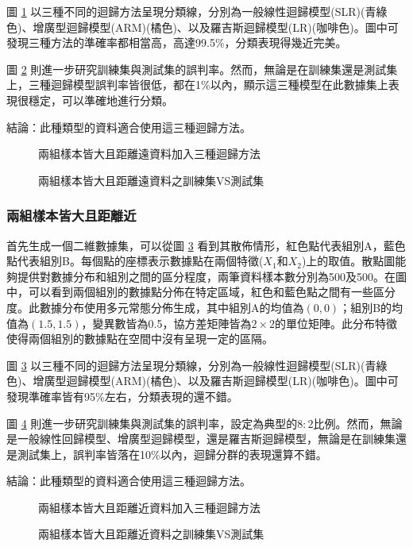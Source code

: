 圖 \ref{fig:rdn11-LARline} 以三種不同的迴歸方法呈現分類線，分別為一般線性迴歸模型(SLR)(青綠色)、增廣型迴歸模型(ARM)(橘色)、以及羅吉斯迴歸模型(LR)(咖啡色)。圖中可發現三種方法的準確率都相當高，高達99.5\%，分類表現得幾近完美。

圖 \ref{fig:rdn11-LARline2} 則進一步研究訓練集與測試集的誤判率。然而，無論是在訓練集還是測試集上，三種迴歸模型誤判率皆很低，都在1\%以內，顯示這三種模型在此數據集上表現很穩定，可以準確地進行分類。

結論：此種類型的資料適合使用這三種迴歸方法。
\begin{figure}[H]
    \caption{兩組樣本皆大且距離遠資料加入三種迴歸方法}
    \label{fig:rdn11-LARline}
\end{figure}
\begin{figure}[H]
    \caption{兩組樣本皆大且距離遠資料之訓練集VS測試集}
    \label{fig:rdn11-LARline2}
\end{figure}


\subsubsection{兩組樣本皆大且距離近}

首先生成一個二維數據集，可以從圖 \ref{fig:rdn12-LARline} 看到其散佈情形，紅色點代表組別A，藍色點代表組別B。每個點的座標表示數據點在兩個特徵($X_1$和$X_2$)上的取值。散點圖能夠提供對數據分布和組別之間的區分程度，兩筆資料樣本數分別為500及500。在圖中，可以看到兩個組別的數據點分佈在特定區域，紅色和藍色點之間有一些區分度。此數據分布使用多元常態分佈生成，其中組別A的均值為$(0, 0)$；組別B的均值為$(1.5, 1.5)$，變異數皆為0.5，協方差矩陣皆為$2 \times 2$的單位矩陣。此分布特徵使得兩個組別的數據點在空間中沒有呈現一定的區隔。

圖 \ref{fig:rdn12-LARline} 以三種不同的迴歸方法呈現分類線，分別為一般線性迴歸模型(SLR)(青綠色)、增廣型迴歸模型(ARM)(橘色)、以及羅吉斯迴歸模型(LR)(咖啡色)。圖中可發現準確率皆有95\%左右，分類表現的還不錯。

圖 \ref{fig:rdn12-LARline2} 則進一步研究訓練集與測試集的誤判率，設定為典型的$8:2$比例。然而，無論是一般線性回歸模型、增廣型迴歸模型，還是羅吉斯迴歸模型，無論是在訓練集還是測試集上，誤判率皆落在10\%以內，迴歸分群的表現還算不錯。

結論：此種類型的資料適合使用這三種迴歸方法。
\begin{figure}[h]
    \caption{兩組樣本皆大且距離近資料加入三種迴歸方法}
    \label{fig:rdn12-LARline}
\end{figure}
\begin{figure}[h]
    \caption{兩組樣本皆大且距離近資料之訓練集VS測試集}
    \label{fig:rdn12-LARline2}
\end{figure}
